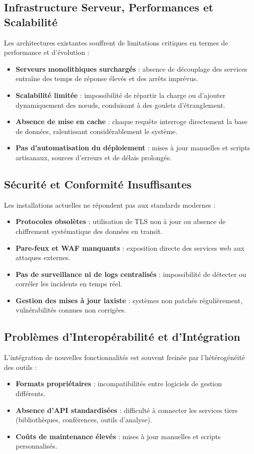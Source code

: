 \documentclass[12pt]{rapportPfe}
\begin{document}
\subsection{Infrastructure Serveur, Performances et Scalabilité}
Les architectures existantes souffrent de limitations critiques en termes de performance et d’évolution :
\begin{itemize}[itemsep=1em]
  \item \textbf{Serveurs monolithiques surchargés} : absence de découplage des services entraîne des temps de réponse élevés et des arrêts imprévus.
  \item \textbf{Scalabilité limitée} : impossibilité de répartir la charge ou d’ajouter dynamiquement des nœuds, conduisant à des goulets d’étranglement.
  \item \textbf{Absence de mise en cache} : chaque requête interroge directement la base de données, ralentissant considérablement le système.
  \item \textbf{Pas d’automatisation du déploiement} : mises à jour manuelles et scripts artisanaux, sources d’erreurs et de délais prolongés.
\end{itemize}

\subsection{Sécurité et Conformité Insuffisantes}
Les installations actuelles ne répondent pas aux standards modernes :
\begin{itemize}[itemsep=1em]
  \item \textbf{Protocoles obsolètes} : utilisation de TLS non à jour ou absence de chiffrement systématique des données en transit.
  \item \textbf{Pare-feux et WAF manquants} : exposition directe des services web aux attaques externes.
  \item \textbf{Pas de surveillance ni de logs centralisés} : impossibilité de détecter ou corréler les incidents en temps réel.
  \item \textbf{Gestion des mises à jour laxiste} : systèmes non patchés régulièrement, vulnérabilités connues non corrigées.
\end{itemize}

\subsection{Problèmes d’Interopérabilité et d’Intégration}
L’intégration de nouvelles fonctionnalités est souvent freinée par l’hétérogénéité des outils :
\begin{itemize}[itemsep=1em]
  \item \textbf{Formats propriétaires} : incompatibilités entre logiciels de gestion différents.
  \item \textbf{Absence d’API standardisées} : difficulté à connecter les services tiers (bibliothèques, conférences, outils d’analyse).
  \item \textbf{Coûts de maintenance élevés} : mises à jour manuelles et scripts personnalisés.
\end{itemize}
\end{document}
